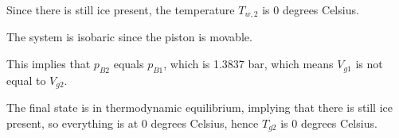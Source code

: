 Since there is still ice present, the temperature \( T_{w,2} \) is 0 degrees Celsius.

The system is isobaric since the piston is movable.

This implies that \( p_{B2} \) equals \( p_{B1} \), which is 1.3837 bar, which means \( V_{g1} \) is not equal to \( V_{g2} \).

The final state is in thermodynamic equilibrium, implying that there is still ice present, so everything is at 0 degrees Celsius, hence \( T_{g2} \) is 0 degrees Celsius.